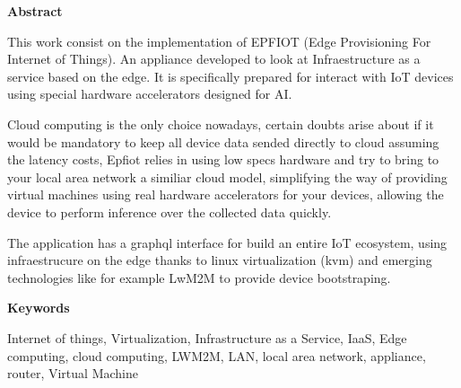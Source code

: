 
\newpage

\thispagestyle{empty}

\begin{center}

{\bf \Huge Abstract}

  \end{center}
\vspace{1cm}

This work consist on the implementation of EPFIOT (Edge Provisioning For Internet of Things). An appliance developed to look at Infraestructure as a service based on the edge. It is specifically prepared for interact with IoT devices using special hardware accelerators designed for AI.

Cloud computing is the only choice nowadays, certain doubts arise about if it would be mandatory to keep all device data sended directly to cloud assuming the latency costs, Epfiot relies in using low specs hardware and try to bring to your local area network a similiar cloud model, simplifying the way of providing virtual machines using real hardware accelerators for your devices, allowing the device to perform inference over the collected data quickly.

The application has a graphql interface for build an entire IoT ecosystem, using infraestrucure on the edge thanks to linux virtualization (kvm) and emerging technologies like for example LwM2M to provide device bootstraping.

\vspace{1cm}


\begin{center}

{\bf \Large Keywords}

   \end{center}

   \vspace{0.5cm}
   
Internet of things, Virtualization, Infrastructure as a Service, IaaS, Edge computing, cloud computing, LWM2M, LAN, local area network, appliance, router, Virtual Machine
   


